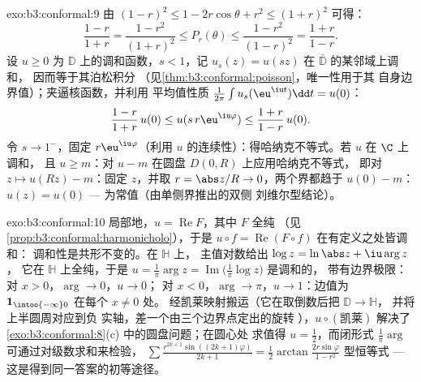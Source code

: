 \begin{solution}{exo:b3:conformal:9}
由 $(1-r)^2 \leq 1 - 2r\cos\theta + r^2 \leq (1+r)^2$ 可得：
\[
\frac{1-r}{1+r} = \frac{1 - r^2}{(1+r)^2} \leq P_r(\theta)
\leq \frac{1 - r^2}{(1 - r)^2} = \frac{1+r}{1-r} .
\]
设 $u \geq 0$ 为 $\mathbb D$ 上的调和函数，$s < 1$，记 $u_s(z) =
u(sz)$ 在 $\bar{\mathbb D}$ 的某邻域上调和，
因而等于其泊松积分
（见\cref{thm:b3:conformal:poisson}，唯一性用于其
自身边界值）；夹逼核函数，并利用
平均值性质 $\frac1{2\pi}\int u_s(\eu^{\iu t})\dd t = u(0)$：
\[
\frac{1-r}{1+r}\,u(0) \leq u(s\,r\eu^{\iu\varphi}) \leq
\frac{1+r}{1-r}\,u(0).
\]
令 $s \to 1^-$，固定 $r\eu^{\iu\varphi}$（利用
$u$ 的连续性）：得哈纳克不等式。若 $u$ 在 $\C$ 上调和，
且 $u \geq m$：对 $u - m$ 在圆盘 $D(0, R)$ 上应用哈纳克不等式，
即对 $z \mapsto u(Rz) - m$：固定 $z$，并取 $r =
\abs z/R \to 0$，两个界都趋于 $u(0) - m$：$u(z) =
u(0)$ --- 为常值（由单侧界推出的双侧
刘维尔型结论）。
\end{solution}

\begin{solution}{exo:b3:conformal:10}
局部地，$u = \operatorname{Re}F$，其中 $F$ 全纯
（见\cref{prop:b3:conformal:harmonicholo}），于是 $u\circ f =
\operatorname{Re}(F\circ f)$ 在有定义之处皆调和：
调和性是共形不变的。在 $\mathbb H$ 上，
主值对数给出 $\log z = \ln\abs z + \iu\arg z$，
它在 $\mathbb H$ 上全纯，于是 $u = \frac1\pi\arg z =
\operatorname{Im}\bigl(\frac1\pi\log z\bigr)$ 是调和的，
带有边界极限：对 $x > 0$，$\arg \to 0$，$u \to 0$；
对 $x < 0$，$\arg \to \pi$，$u \to 1$：边值为 $\mathbf
1_{\intoo{-\infty}0}$ 在每个 $x \neq 0$ 处。
经凯莱映射搬运（它在取倒数后把 $\mathbb D \to \mathbb H$，
并将上半圆周对应到负
实轴，差一个由三个边界点定出的旋转
），$u\circ(\text{凯莱})$ 解决了
\cref{exo:b3:conformal:8}(c) 中的圆盘问题；在圆心处
求值得 $u = \frac12$，而闭形式
$\frac1\pi\arg$ 可通过对级数求和来检验，
$\sum\frac{r^{2k+1}\sin((2k+1)\varphi)}{2k+1} =
\frac12\arctan\frac{2r\sin\varphi}{1 - r^2}$ 型恒等式
--- 这是得到同一答案的初等途径。
\end{solution}

